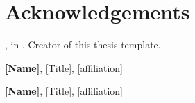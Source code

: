 \chapter*{Acknowledgements}
\textbf{\thesisauthor}, \degreetype in \degreename, \dtuorg \newline
Creator of this thesis template.

\textbf{[Name]}, [Title], [affiliation] \newline
[text]

\textbf{[Name]}, [Title], [affiliation] \newline
[text]

